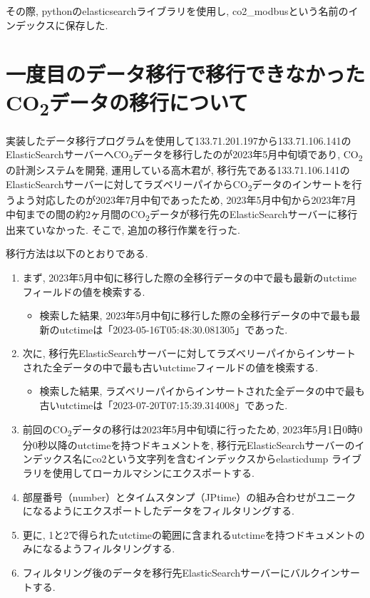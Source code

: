その際, pythonのelasticsearchライブラリを使用し, co2\_modbusという名前のインデックスに保存した.

\section{一度目のデータ移行で移行できなかったCO\textsubscript{2}データの移行について}

実装したデータ移行プログラムを使用して133.71.201.197から133.71.106.141のElasticSearchサーバーへCO\textsubscript{2}データを移行したのが2023年5月中旬頃であり, CO\textsubscript{2}の計測システムを開発, 運用している高木君が, 移行先である133.71.106.141のElasticSearchサーバーに対してラズベリーパイからCO\textsubscript{2}データのインサートを行うよう対応したのが2023年7月中旬であったため, 2023年5月中旬から2023年7月中旬までの間の約2ヶ月間のCO\textsubscript{2}データが移行先のElasticSearchサーバーに移行出来ていなかった. そこで, 追加の移行作業を行った.

移行方法は以下のとおりである.

\begin{enumerate}
    \item まず, 2023年5月中旬に移行した際の全移行データの中で最も最新のutctimeフィールドの値を検索する.
          \begin{itemize}
              \item 検索した結果, 2023年5月中旬に移行した際の全移行データの中で最も最新のutctimeは「2023-05-16T05:48:30.081305」であった.
          \end{itemize}
    \item 次に, 移行先ElasticSearchサーバーに対してラズベリーパイからインサートされた全データの中で最も古いutctimeフィールドの値を検索する.
          \begin{itemize}
              \item 検索した結果, ラズベリーパイからインサートされた全データの中で最も古いutctimeは「2023-07-20T07:15:39.314008」であった.
          \end{itemize}
    \item 前回のCO\textsubscript{2}データの移行は2023年5月中旬頃に行ったため, 2023年5月1日0時0分0秒以降のutctimeを持つドキュメントを, 移行元ElasticSearchサーバーのインデックス名にco2という文字列を含むインデックスからelasticdump \cite{1}ライブラリを使用してローカルマシンにエクスポートする.
    \item 部屋番号（number）とタイムスタンプ（JPtime）の組み合わせがユニークになるようにエクスポートしたデータをフィルタリングする.
    \item 更に, 1と2で得られたutctimeの範囲に含まれるutctimeを持つドキュメントのみになるようフィルタリングする.
    \item フィルタリング後のデータを移行先ElasticSearchサーバーにバルクインサートする.
\end{enumerate}

